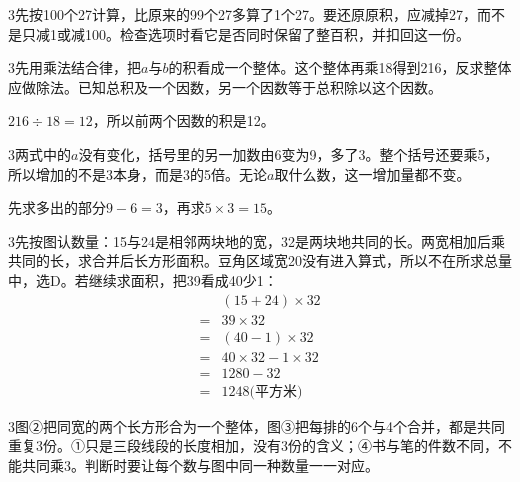 \documentclass[multi=snippet,border={5bp 20bp 5bp 5bp}]{standalone}
\newenvironment{snippet}[3]{\begin{minipage}{#1bp}\color{answerred}\fontsize{#2}{#3}\selectfont\raggedright}{\end{minipage}}
\begin{document}
\begin{snippet}{505}{11.5}{14}\begin{multicols}{3}\raggedcolumns 先按100个27计算，比原来的99个27多算了1个27。要还原原积，应减掉27，而不是只减1或减100。检查选项时看它是否同时保留了整百积，并扣回这一份。\end{multicols}\end{snippet}
\begin{snippet}{505}{11.5}{14}\begin{multicols}{3}\raggedcolumns 先用乘法结合律，把\(a\)\allowbreak 与\(b\)\allowbreak 的积看成一个整体。这个整体再乘18得到216，反求整体应做除法。已知总积及一个因数，另一个因数等于总积除以这个因数。\par \(216\div18=12\)\allowbreak ，所以前两个因数的积是12。\end{multicols}\end{snippet}
\begin{snippet}{505}{11.5}{14}\begin{multicols}{3}\raggedcolumns 两式中的\(a\)\allowbreak 没有变化，括号里的另一加数由6变为9，多了3。整个括号还要乘5，所以增加的不是3本身，而是3的5倍。无论\(a\)\allowbreak 取什么数，这一增加量都不变。\par 先求多出的部分\(9-6=3\)\allowbreak ，再求\(5\times3=15\)\allowbreak 。\end{multicols}\end{snippet}
\begin{snippet}{505}{11.5}{14}\begin{multicols}{3}\raggedcolumns 先按图认数量：15与24是相邻两块地的宽，32是两块地共同的长。两宽相加后乘共同的长，求合并后长方形面积。豆角区域宽20没有进入算式，所以不在所求总量中，选D。若继续求面积，把39看成40少1：\[\begin{aligned}&(15+24)\times32\\={}&39\times32\\={}&(40-1)\times32\\={}&40\times32-1\times32\\={}&1280-32\\={}&1248\text{(平方米)}\end{aligned}\]\end{multicols}\end{snippet}
\begin{snippet}{505}{11.5}{14}\begin{multicols}{3}\raggedcolumns 图②把同宽的两个长方形合为一个整体，图③把每排的6个与4个合并，都是共同重复3份。①只是三段线段的长度相加，没有3份的含义；④书与笔的件数不同，不能共同乘3。判断时要让每个数与图中同一种数量一一对应。\end{multicols}\end{snippet}
\end{document}
